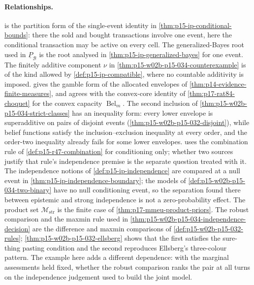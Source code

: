 \paragraph{Relationships.}
 is the partition form of the
single-event identity in \cref{thm:p15-ip-conditional-bounds}: there the
sold and bought transactions involve one event, here the conditional
transaction may be active on every cell. The generalized-Bayes root used in
\(\underline P_{\mathcal B}\) is the root analysed in
\cref{thm:p15-ip-generalized-bayes} for one event. The finitely additive
component \(\nu\) in \cref{thm:p15-w02b-p15-034-counterexample} is of the
kind allowed by \cref{def:p15-ip-compatible}, where no countable additivity
is imposed.
 gives the gamble form of the
allocated envelopes of \cref{thm:p14-evidence-finite-measures}, and
agrees with the convex-core identity of \cref{thm:p17-rat84-choquet} for the
convex capacity \(\operatorname{Bel}_m\). The second inclusion of
\cref{thm:p15-w02b-p15-034-strict-classes} has an inequality form: every
lower envelope is superadditive on pairs of disjoint events
(\cref{thm:p15-w02b-p15-032-disjoint}), while belief functions satisfy the
inclusion--exclusion inequality at every order, and the order-two
inequality already fails for some lower envelopes.
 uses the combination rule of
\cref{def:p15-r47-combination} for conditioning only; whether two sources
justify that rule's independence premise is the separate question treated
with it. The independence notions of \cref{def:p15-ip-independence} are
compared at a null event in \cref{thm:p15-ip-independence-boundary}; the
models of \cref{def:p15-w02b-p15-034-two-binary} have no null conditioning
event, so the separation found there between epistemic and strong
independence is not a zero-probability effect. The product set
\(\mathcal M_{\mathrm{str}}\) is the finite case of
\cref{thm:p17-mmeu-product-priors}. The robust comparison and the maxmin
rule used in \cref{thm:p15-w02b-p15-034-independence-decision} are the
difference and maxmin comparisons of \cref{def:p15-w02b-p15-032-rules};
\cref{thm:p15-w02b-p15-032-ellsberg} shows that the first satisfies the
sure-thing pasting condition and the second reproduces Ellsberg's
three-colour pattern. The example here adds a different dependence: with
the marginal assessments held fixed, whether the robust comparison ranks
the pair at all turns on the independence judgement used to build the
joint model.
